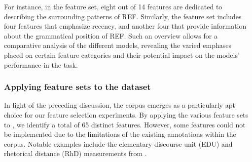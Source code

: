 For instance, in the  feature set, eight out of 14 features are dedicated to describing the surrounding patterns of REF. Similarly, the  feature set includes four features that emphasize recency, and another four that provide information about the grammatical position of REF. Such an overview allows for a comparative analysis of the different models, revealing the varied emphases placed on certain feature categories and their potential impact on the models' performance in the \context task.

 \begin{table}
 \caption[General classes of the features used in the feature sets.]{General classes of the features used in the feature sets.}
 \label{tab:features}
 \end{table}

\subsubsection{Applying feature sets to the \wsj dataset}\label{seubsec:corpus}
In light of the preceding discussion, the \wsj corpus emerges as a particularly apt choice for our feature selection experiments. By applying the various feature sets to \wsj, we identify a total of 65 distinct features. However, some features could not be implemented due to the limitations of the existing annotations within the corpus. Notable examples include the elementary discourse unit (EDU) and rhetorical distance (RhD) measurements from \citet{kibrik2016referential}. 

